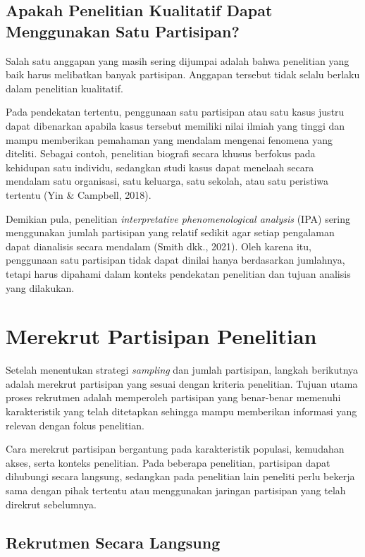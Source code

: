 \documentclass[
  indonesian,
  letterpaper,
  DIV=11,
  numbers=noendperiod]{scrreprt}
\begin{document}
\subsection{Apakah Penelitian Kualitatif Dapat Menggunakan Satu
Partisipan?}\label{apakah-penelitian-kualitatif-dapat-menggunakan-satu-partisipan}

Salah satu anggapan yang masih sering dijumpai adalah bahwa penelitian
yang baik harus melibatkan banyak partisipan. Anggapan tersebut tidak
selalu berlaku dalam penelitian kualitatif.

Pada pendekatan tertentu, penggunaan satu partisipan atau satu kasus
justru dapat dibenarkan apabila kasus tersebut memiliki nilai ilmiah
yang tinggi dan mampu memberikan pemahaman yang mendalam mengenai
fenomena yang diteliti. Sebagai contoh, penelitian biografi secara
khusus berfokus pada kehidupan satu individu, sedangkan studi kasus
dapat menelaah secara mendalam satu organisasi, satu keluarga, satu
sekolah, atau satu peristiwa tertentu (Yin \& Campbell, 2018).

Demikian pula, penelitian \emph{interpretative phenomenological
analysis} (IPA) sering menggunakan jumlah partisipan yang relatif
sedikit agar setiap pengalaman dapat dianalisis secara mendalam (Smith
dkk., 2021). Oleh karena itu, penggunaan satu partisipan tidak dapat
dinilai hanya berdasarkan jumlahnya, tetapi harus dipahami dalam konteks
pendekatan penelitian dan tujuan analisis yang dilakukan.

\section{Merekrut Partisipan
Penelitian}\label{merekrut-partisipan-penelitian}

Setelah menentukan strategi \emph{sampling} dan jumlah partisipan,
langkah berikutnya adalah merekrut partisipan yang sesuai dengan
kriteria penelitian. Tujuan utama proses rekrutmen adalah memperoleh
partisipan yang benar-benar memenuhi karakteristik yang telah ditetapkan
sehingga mampu memberikan informasi yang relevan dengan fokus
penelitian.

Cara merekrut partisipan bergantung pada karakteristik populasi,
kemudahan akses, serta konteks penelitian. Pada beberapa penelitian,
partisipan dapat dihubungi secara langsung, sedangkan pada penelitian
lain peneliti perlu bekerja sama dengan pihak tertentu atau menggunakan
jaringan partisipan yang telah direkrut sebelumnya.

\subsection{Rekrutmen Secara Langsung}\label{rekrutmen-secara-langsung}
\end{document}
